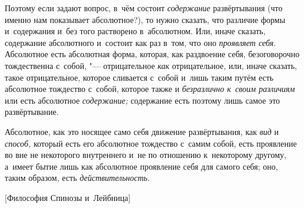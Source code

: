 Поэтому если задают вопрос, в~чём состоит
{\em содержание} развёртывания (что именно нам
показывает абсолютное?), то нужно сказать, что различие формы и~содержания
и~без того растворено в~абсолютном. Или, иначе сказать, содержание
абсолютного и~состоит как раз в~том, что оно
{\em проявляет себя}. Абсолютное есть абсолютная форма,
которая, как раздвоение себя, безоговорочно тождественна с~собой, "---
отрицательное {\em как} отрицательное, или, иначе
сказать, такое отрицательное, которое сливается с~собой и~лишь таким путём
есть абсолютное тождество с~собой, которое также и
{\em безразлично к~своим различиям} или есть абсолютное
{\em содержание;} содержание есть поэтому лишь самое это развёртывание.

Абсолютное, как это носящее само себя движение развёртывания, как
{\em вид} и {\em способ,} который
есть его абсолютное тождество с~самим собой, есть проявление во вне не
некоторого внутреннего и~не по отношению к~некоторому другому, а~имеет
бытие лишь как абсолютное проявление себя для самого себя; оно, таким
образом, есть {\em действительность}.

%
  {[Философия Спинозы и~Лейбница]}

